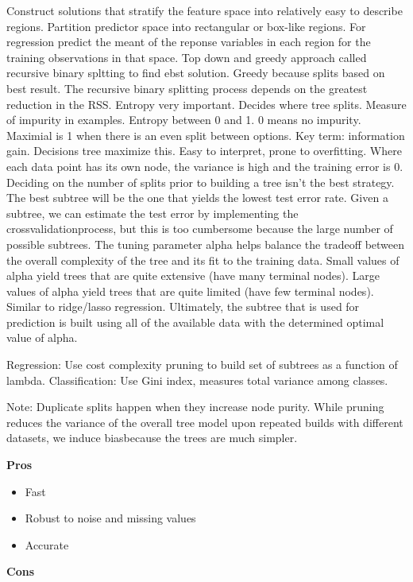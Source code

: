 \documentclass[]{book}
\begin{document}
Construct solutions that stratify the feature space into relatively easy to describe regions. Partition predictor space into rectangular or box-like regions. For regression predict the meant of the reponse variables in each region for the training observations in that space. Top down and greedy approach called recursive binary spltting to find ebst solution. Greedy because splits based on best result. The recursive binary splitting process depends on the greatest reduction in the RSS. Entropy very important. Decides where tree splits. Measure of impurity in examples. Entropy between 0 and 1. 0 means no impurity. Maximial is 1 when there is an even split between options. Key term: information gain. Decisions tree maximize this. Easy to interpret, prone to overfitting.
Where each data point has its own node, the variance is high and the training error is 0. Deciding on the number of splits prior to building a tree isn't the best strategy. The best subtree will be the one that yields the lowest test error rate. Given a subtree, we can estimate the test error by implementing the crossvalidationprocess, but this is too cumbersome because the large number of possible subtrees. The tuning parameter alpha helps balance the tradeoff between the overall complexity of the tree and its fit to the training data. Small values of alpha yield trees that are quite extensive (have many terminal nodes). Large values of alpha yield trees that are quite limited (have few terminal nodes). Similar to ridge/lasso regression. Ultimately, the subtree that is used for prediction is built using all of the available data with the determined optimal value of alpha.

Regression: Use cost complexity pruning to build set of subtrees as a function of lambda. Classification: Use Gini index, measures total variance among classes.

Note: Duplicate splits happen when they increase node purity. While pruning reduces the variance of the overall tree model upon repeated builds with different datasets, we induce biasbecause the trees are much simpler.

\textbf{Pros}

\begin{itemize}
\item
  Fast
\item
  Robust to noise and missing values
\item
  Accurate
\end{itemize}

\textbf{Cons}
\end{document}

